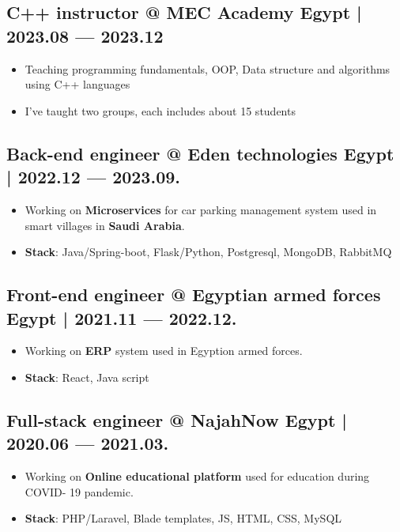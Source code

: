 \documentclass[a4,10pt]{article}
\newenvironment{zitemize}{
\begin{itemize}\itemsep0pt \parskip0pt \parsep1pt}
{\end{itemize}\vspace{-0.5cm}}
\begin{document}
\subsection*{C++ instructor @ MEC Academy \hfill Egypt | 2023.08 --- 2023.12} 
    \begin{zitemize}
        \item Teaching programming fundamentals, OOP, Data structure and algorithms
        using C++ languages
        \item I’ve taught two groups, each includes about 15 students
    \end{zitemize}

\subsection*{Back-end engineer @ Eden technologies \hfill Egypt | 2022.12 --- 2023.09.} 
    \begin{zitemize}
        \item Working on \textbf{Microservices} for car parking management system used in smart villages in
        \textbf{Saudi Arabia}.
        \item \textbf{Stack}: Java/Spring-boot, Flask/Python, Postgresql, MongoDB, RabbitMQ
    \end{zitemize}

\subsection*{Front-end engineer @ Egyptian armed forces \hfill Egypt | 2021.11 --- 2022.12.} 
    \begin{zitemize}
        \item Working on \textbf{ERP} system used in Egyption armed forces.
        \item \textbf{Stack}: React, Java script
    \end{zitemize}

\subsection*{Full-stack engineer @ NajahNow \hfill Egypt | 2020.06 --- 2021.03.} 
    \begin{zitemize}
        \item Working on \textbf{Online educational platform} used for education during COVID-
        19 pandemic.
        \item \textbf{Stack}: PHP/Laravel, Blade templates, JS, HTML, CSS, MySQL
    \end{zitemize}
\end{document}
